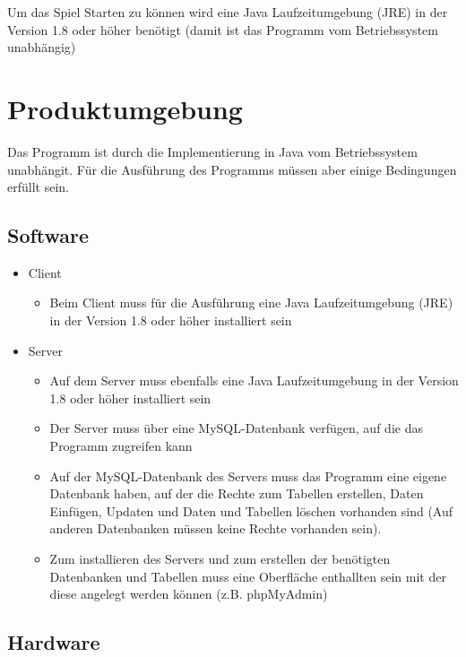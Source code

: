 Um das Spiel Starten zu können wird eine Java Laufzeitumgebung (JRE) in der Version 1.8 oder höher benötigt (damit ist das Programm vom Betriebssystem unabhängig)


\chapter{Produktumgebung}

Das Programm ist durch die Implementierung in Java vom Betriebssystem unabhängit. Für die Ausführung des Programms müssen aber einige Bedingungen erfüllt sein.

\section{Software}

\begin{itemize}
	\item Client
	\begin{itemize}
		\item Beim Client muss für die Ausführung eine Java Laufzeitumgebung (JRE) in der Version 1.8 oder höher installiert sein
	\end{itemize}
	\item Server
	\begin{itemize}
		\item Auf dem Server muss ebenfalls eine Java Laufzeitumgebung in der Version 1.8 oder höher installiert sein
		\item Der Server muss über eine MySQL-Datenbank verfügen, auf die das Programm zugreifen kann
		\item Auf der MySQL-Datenbank des Servers muss das Programm eine eigene Datenbank haben, auf der die Rechte zum Tabellen erstellen, Daten Einfügen, Updaten und Daten und Tabellen löschen vorhanden sind (Auf anderen Datenbanken müssen keine Rechte vorhanden sein).
		\item Zum installieren des Servers und zum erstellen der benötigten Datenbanken und Tabellen muss eine Oberfläche enthallten sein mit der diese angelegt werden können (z.B. phpMyAdmin)
	\end{itemize}
\end{itemize}


\section{Hardware}

